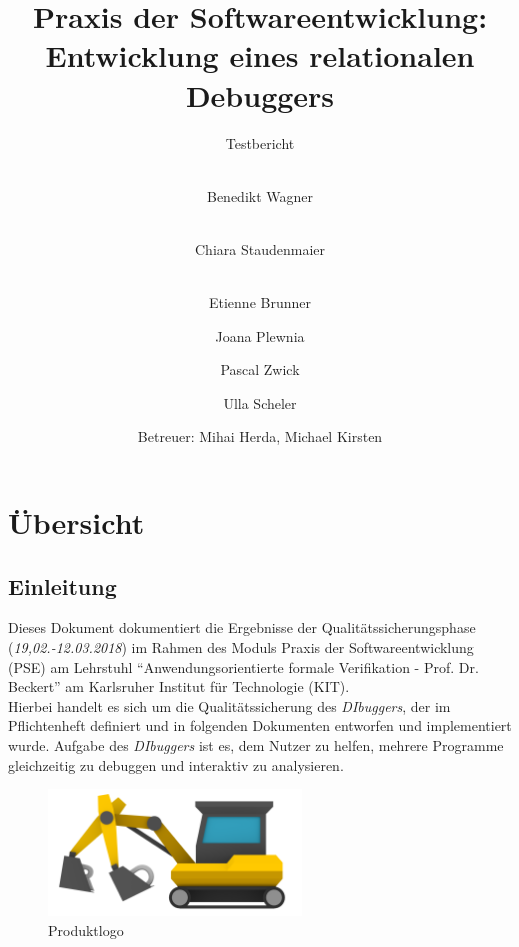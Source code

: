 \documentclass[parskip=full]{scrartcl}
\title{
	\vspace{2cm}
	\myfont 
	Praxis der Softwareentwicklung:\\ 
	Entwicklung eines relationalen Debuggers\\
}
\subtitle{
	\vspace{1cm}
	\myfont
	Testbericht
}
\author{
	\vspace{1cm} \\
	Benedikt Wagner\\
	\and 
        \vspace{1cm} \\ 
        Chiara Staudenmaier\\
        \and 
        \vspace{1cm} \\
        Etienne Brunner\\
	\and Joana Plewnia\\
	\and Pascal Zwick\\
	\and Ulla Scheler\\
	\vspace{1cm}
	\and Betreuer: Mihai Herda, Michael Kirsten
	\vspace{4cm}
}
\begin{document}
\clearpage
\maketitle
{}
\newpage

\tableofcontents
\newpage
{}

\section{Übersicht}

\subsection{Einleitung}
Dieses Dokument dokumentiert die Ergebnisse der Qualitätssicherungsphase (\textit{19,02.-12.03.2018}) im Rahmen des Moduls Praxis der Softwareentwicklung (PSE) am Lehrstuhl \enquote{Anwendungsorientierte formale Verifikation - Prof. Dr. Beckert} am Karlsruher Institut für Technologie (KIT).\\
Hierbei handelt es sich um die Qualitätssicherung des \textit{DIbuggers}, der im Pflichtenheft definiert und in folgenden Dokumenten entworfen und implementiert wurde. Aufgabe des \textit{DIbuggers} ist es, dem Nutzer zu helfen, mehrere Programme gleichzeitig zu debuggen und interaktiv zu analysieren. \\

\begin{figure}[!h]
\centering
\includegraphics[width=0.6\textwidth]{../Plichtenheft/logo_nongi.png}
\caption{Produktlogo}
\end{figure}
\end{document}
